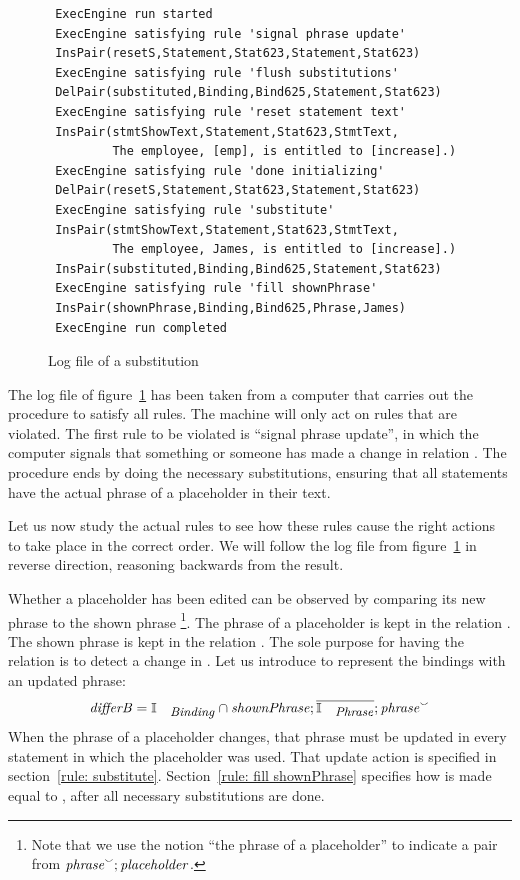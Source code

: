 \documentclass{svproc}
\begin{document}
\begin{figure}[htb]
\begin{verbatim}
 ExecEngine run started
 ExecEngine satisfying rule 'signal phrase update'
 InsPair(resetS,Statement,Stat623,Statement,Stat623)
 ExecEngine satisfying rule 'flush substitutions'
 DelPair(substituted,Binding,Bind625,Statement,Stat623)
 ExecEngine satisfying rule 'reset statement text'
 InsPair(stmtShowText,Statement,Stat623,StmtText,
         The employee, [emp], is entitled to [increase].)
 ExecEngine satisfying rule 'done initializing'
 DelPair(resetS,Statement,Stat623,Statement,Stat623)
 ExecEngine satisfying rule 'substitute'
 InsPair(stmtShowText,Statement,Stat623,StmtText,
         The employee, James, is entitled to [increase].)
 InsPair(substituted,Binding,Bind625,Statement,Stat623)
 ExecEngine satisfying rule 'fill shownPhrase'
 InsPair(shownPhrase,Binding,Bind625,Phrase,James)
 ExecEngine run completed
\end{verbatim}
\caption{Log file of a substitution}
\label{fig:log file}
\end{figure}
	The log file of figure~\ref{fig:log file} has been taken from a computer that carries out the procedure to satisfy all rules.
	The machine will only act on rules that are violated.
	The first rule to be violated is ``signal phrase update'', in which the computer signals that something or someone has made a change
	in relation .
	The procedure ends by doing the necessary substitutions,
	ensuring that all statements have the actual phrase of a placeholder in their text.

	Let us now study the actual rules to see how these rules cause the right actions to take place in the correct order.
	We will follow the log file from figure~\ref{fig:log file} in reverse direction,
	reasoning backwards from the result.

	Whether a placeholder has been edited can be observed by comparing its new phrase to the shown phrase%
\footnote{Note that we use the notion ``the phrase of a placeholder'' to indicate a pair from ${\text{\em phrase\/}}^\smallsmile;\text{\em placeholder\/}$.}.
	The phrase of a placeholder is kept in the relation .
	The shown phrase is kept in the relation .
	The sole purpose for having the relation  is to detect a change in .
	Let us introduce  to represent the bindings with an updated phrase:
\[\id{differB} = \ident{Binding}\cap\id{shownPhrase};\cmpl{\ident{Phrase}};\flip{\id{phrase}}\]
	When the phrase of a placeholder changes,
	that phrase must be updated in every statement in which the placeholder was used.
	That update action is specified in section~\ref{rule: substitute}.
	Section~\ref{rule: fill shownPhrase} specifies how  is made equal to ,
	after all necessary substitutions are done.
\end{document}

